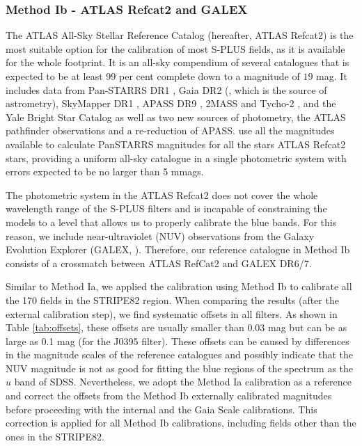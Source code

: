 \documentclass[fleqn,usenatbib]{mnras}
\begin{document}
\subsubsection{Method Ib - ATLAS Refcat2 and GALEX}

The ATLAS All-Sky Stellar Reference Catalog \citep{Tonry+2018} (hereafter, ATLAS Refcat2) is the most suitable option for the calibration of most S-PLUS fields, as it is available for the whole footprint. It is an all-sky compendium of several catalogues that is expected to be at least 99 per cent complete down to a magnitude of $19$ mag. It includes data from Pan-STARRS DR1 \citep{Chambers+2016, Flewelling+2020}, Gaia DR2 (\citealp{GaiaCollaboration+2018}, which is the source of astrometry), SkyMapper DR1 \citep{Wolf+2018}, APASS DR9 \citep{Henden+2014, Henden+2016},  2MASS \citep{Skrutskie+2006} and Tycho-2 \citep{Hog+2000, Pickles+Depagne2010}, and the Yale Bright Star Catalog as well as two new sources of photometry, the ATLAS pathfinder observations and a re-reduction of APASS. \citet{Tonry+2018} use all the magnitudes available to calculate PanSTARRS  magnitudes for all the stars ATLAS Refcat2 stars, providing a uniform all-sky catalogue in a single photometric system with errors expected to be no larger than 5 mmags.  

The photometric system in the ATLAS Refcat2 does not cover the whole wavelength range of the S-PLUS filters and is incapable of constraining the models to a level that allows us to properly calibrate the blue bands. For this reason, we include near-ultraviolet (NUV) observations from the Galaxy Evolution Explorer (GALEX, \citealp{Morrissey+2005}). Therefore, our reference catalogue in Method Ib consists of a crossmatch between ATLAS RefCat2 and GALEX DR6/7.

Similar to Method Ia, we applied the calibration using Method Ib to calibrate all the 170 fields in the STRIPE82 region. When comparing the results (after the external calibration step), we find systematic offsets in all filters. As shown in Table \ref{tab:offsets}, these offsets are usually smaller than 0.03 mag but can be as large as 0.1 mag (for the J0395 filter). These offsets can be caused by differences in the magnitude scales of the reference catalogues and possibly indicate that the NUV magnitude is not as good for fitting the blue regions of the spectrum as the $u$ band of SDSS. Nevertheless, we adopt the Method Ia calibration as a reference and correct the offsets from the Method Ib externally calibrated magnitudes before proceeding with the internal and the Gaia Scale calibrations. This correction is applied for all Method Ib calibrations, including fields other than the ones in the STRIPE82.
\end{document}
